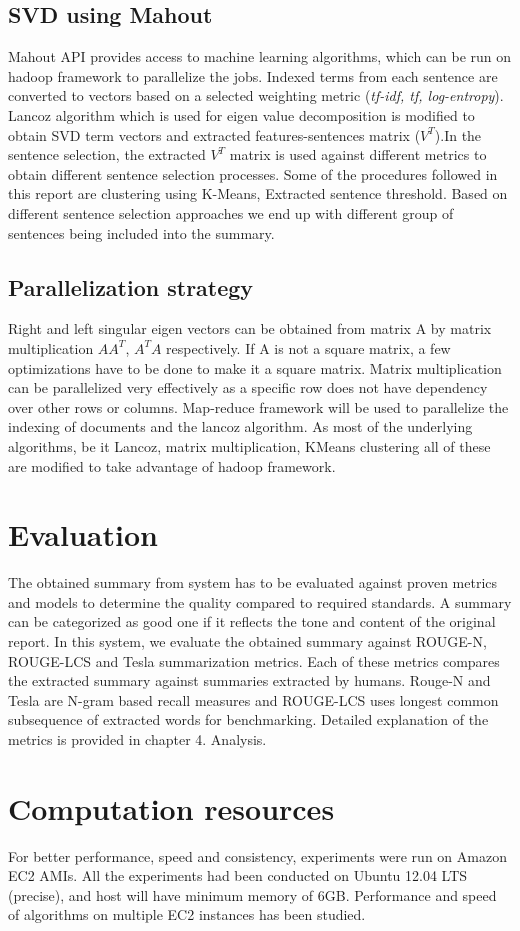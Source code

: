 \subsection{SVD using Mahout}
Mahout API provides access to machine learning algorithms, which can be run on hadoop framework to parallelize the jobs.
Indexed terms from each sentence are converted to vectors based on a selected weighting metric (\textit{tf-idf, tf, log-entropy}).
Lancoz algorithm which is used for eigen value decomposition is modified to obtain SVD term vectors and extracted 
features-sentences matrix ($V^T$).In the sentence selection, the extracted $V^T$ matrix is used against different metrics to obtain
different sentence selection processes. Some of the procedures followed in this report are clustering using K-Means, Extracted sentence threshold.
Based on different sentence selection approaches we end up with different group of sentences being included into the summary.
\subsection{Parallelization strategy}
Right and left singular eigen vectors can be obtained from  matrix A by matrix multiplication $A A^T$, $A^T A$ respectively.
If A is not a square matrix, a few optimizations have to be done to make it a square matrix. Matrix multiplication can be parallelized
very effectively as a specific row does not have dependency over other rows or columns. Map-reduce framework will be used to
parallelize the indexing of documents and the lancoz algorithm. As most of the underlying algorithms, be it Lancoz, matrix multiplication,
KMeans clustering all of these are modified to take advantage of hadoop framework.
\section{Evaluation}
The obtained summary from system has to be evaluated against proven metrics and models to determine the quality compared to required standards.
A summary can be categorized as good one if it reflects the tone and content of the original report. In this system, we evaluate the obtained
summary against ROUGE-N, ROUGE-LCS and Tesla summarization metrics. Each of these metrics compares the extracted summary against summaries extracted by 
humans. Rouge-N and Tesla are N-gram based recall measures and ROUGE-LCS uses longest common subsequence of extracted words for benchmarking.
Detailed explanation of the metrics is provided in chapter 4. Analysis.
\section{Computation resources}
For better performance, speed and consistency, experiments were run on Amazon EC2 AMIs.
All the experiments had been conducted on Ubuntu 12.04 LTS (precise), and host will have minimum memory of 6GB.
Performance and speed of algorithms on multiple EC2 instances has been studied.
